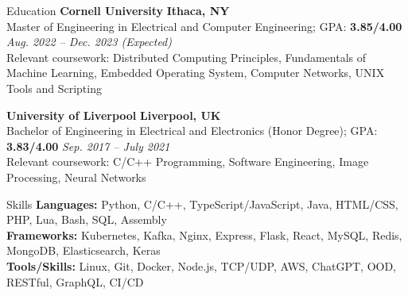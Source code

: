 \documentclass{resume} %
\begin{document}
\begin{rSection}{Education}
{\textbf{Cornell University}} \hfill{\textbf{Ithaca, NY}}
\\ Master of Engineering in Electrical and Computer Engineering; GPA: \textbf{3.85/4.00} \hfill{\em Aug. 2022 -- Dec. 2023 (Expected)}
\\ Relevant coursework: Distributed Computing Principles, Fundamentals of Machine Learning, Embedded Operating System, Computer Networks, UNIX Tools and Scripting

{\textbf{University of Liverpool}} \hfill{\textbf{Liverpool, UK}}
\\ Bachelor of Engineering in Electrical and Electronics (Honor Degree); GPA: \textbf{3.83/4.00} \hfill{\em Sep. 2017 -- July 2021}
\\ Relevant coursework: C/C++ Programming, Software Engineering, Image Processing, Neural Networks
\end{rSection}

\begin{rSection}{Skills}
{\textbf{Languages:}} Python, C/C++, TypeScript/JavaScript, Java, HTML/CSS, PHP, Lua, Bash, SQL, Assembly
\\{\textbf{Frameworks:}} Kubernetes, Kafka, Nginx, Express, Flask, React, MySQL, Redis, MongoDB, Elasticsearch, Keras
\\{\textbf{Tools/Skills:}} Linux, Git, Docker, Node.js, TCP/UDP, AWS, ChatGPT, OOD, RESTful, GraphQL, CI/CD

\end{rSection}
\end{document}
